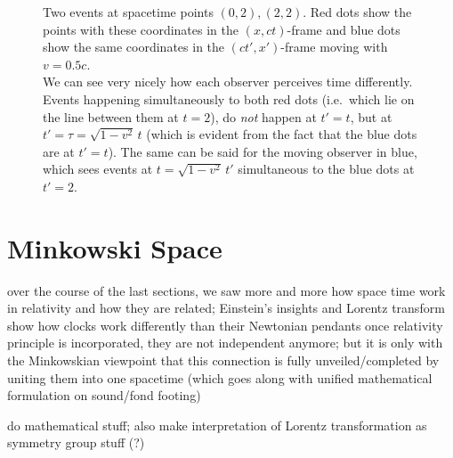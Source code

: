 \begin{figure}
	\centering
	
	
	\caption{Two events at spacetime points $(0,2), (2,2)$. Red dots show the points with these coordinates in the $(x, ct)$-frame and blue dots show the same coordinates in the $(ct', x')$-frame moving with $v = 0.5 c$.\\
	We can see very nicely how each observer perceives time differently. Events happening simultaneously to both red dots (i.e.~which lie on the line between them at $t = 2$), do \emph{not} happen at $t' = t$, but at $t' = \tau = \sqrt{1 - v^2} \, t$ (which is evident from the fact that the blue dots are at $t' = t$). The same can be said for the moving observer in blue, which sees events at $t = \sqrt{1 - v^2} \, t'$ simultaneous to the blue dots at $t' = 2$.}
\end{figure}



\newpage



	\section{Minkowski Space}
over the course of the last sections, we saw more and more how space time work in relativity and how they are related; Einstein's insights and Lorentz transform show how clocks work differently than their Newtonian pendants once relativity principle is incorporated, they are not independent anymore; but it is only with the Minkowskian viewpoint that this connection is fully unveiled/completed by uniting them into one spacetime (which goes along with unified mathematical formulation on sound/fond footing)


do mathematical stuff; also make interpretation of Lorentz transformation as symmetry group stuff (?)

